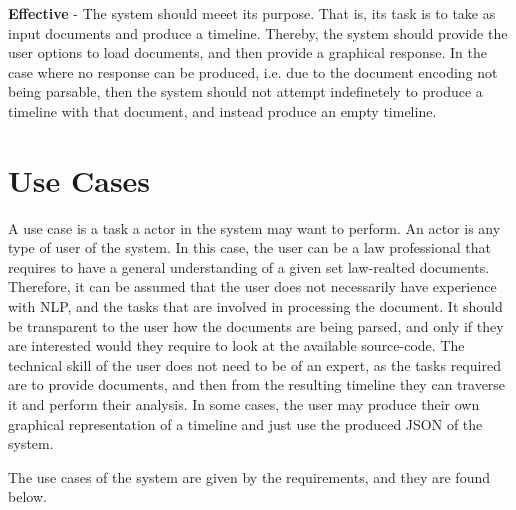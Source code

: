 \par \textbf{Effective} - The system should meeet its purpose. That is, its task is to take as input documents and produce a timeline. Thereby, the system should provide the user options to load documents, and then provide a graphical response. In the case where no response can be produced, i.e. due to the document encoding not being parsable, then the system should not attempt indefinetely to produce a timeline with that document, and instead produce an empty timeline. 
\section{Use Cases}
\par A use case is a task a actor in the system may want to perform. An actor is any type of user of the system. In this case, the user can be a law professional that requires to have a general understanding of a given set law-realted documents. Therefore, it can be assumed that the user does not necessarily have experience with NLP, and the tasks that are involved in processing the document. It should be transparent to the user how the documents are being parsed, and only if they are interested would they require to look at the available source-code. The technical skill of the user does not need to be of an expert, as the tasks required are to provide documents, and then from the resulting timeline they can traverse it and perform their analysis. In some cases, the user may produce their own graphical representation of a timeline and just use the produced JSON of the system.
\par The use cases of the system are given by the requirements, and they are found below.
